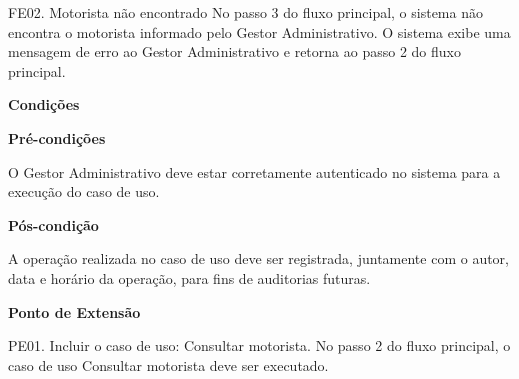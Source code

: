     FE02. Motorista não encontrado
	No passo 3 do fluxo principal, o sistema não encontra o motorista informado pelo Gestor Administrativo. O sistema exibe uma
	mensagem de erro ao Gestor Administrativo e retorna ao passo 2 do fluxo principal.

	
   {\raggedright
      \textbf{Condições}
   }
   
    
   \textbf{Pré-condições}
   
   O Gestor Administrativo deve estar corretamente autenticado no sistema para a execução do caso de uso.
   
   \textbf{Pós-condição}
   
   A operação realizada no caso de uso deve ser registrada, juntamente com o autor, data e horário da operação, para fins de auditorias futuras.


   {\raggedright
      \textbf{Ponto de Extensão}
   }
   
   
    PE01. Incluir o caso de uso: Consultar motorista.
	    No passo 2 do fluxo principal, o caso de uso Consultar motorista deve ser executado.
   


  